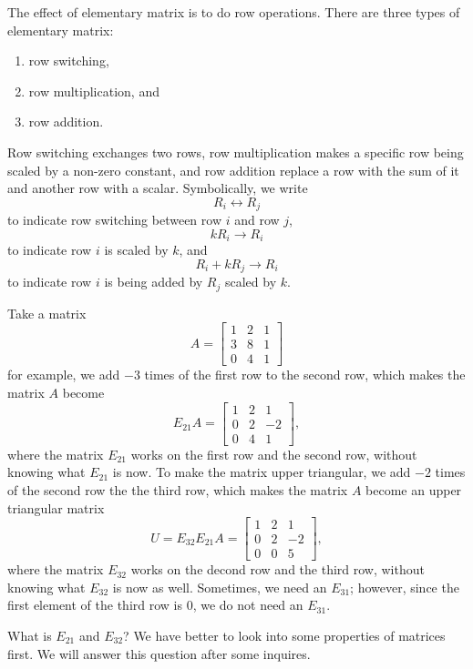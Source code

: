 \documentclass[11pt]{article}
\theoremstyle{break}
\theoremstyle{no_label}
\numberwithin{equation}{section}
\begin{document}
\begin{definition}
    The effect of elementary matrix is to do row operations. There are three types of elementary matrix: \begin{enumerate}
        \item row switching,
        \item row multiplication, and
        \item row addition.
    \end{enumerate}
    Row switching exchanges two rows, row multiplication makes a specific row being scaled by a non-zero constant, and row addition replace a row with the sum of it and another row with a scalar. Symbolically, we write $$R_i\leftrightarrow R_j$$ to indicate row switching between row $i$ and row $j$, $$kR_i\to R_i$$ to indicate row $i$ is scaled by $k$, and $$R_i+kR_j\to R_i$$ to indicate row $i$ is being added by $R_j$ scaled by $k$.
\end{definition}

Take a matrix $$A=\begin{bmatrix}
    1 & 2 & 1 \\
    3 & 8 & 1 \\
    0 & 4 & 1
\end{bmatrix}$$ for example, we add $-3$ times of the first row to the second row, which makes the matrix $A$ become $$E_{21}A=\begin{bmatrix}
    1 & 2 & 1 \\
    0 & 2 & -2 \\
    0 & 4 & 1
\end{bmatrix},$$ where the matrix $E_{21}$ works on the first row and the second row, without knowing what $E_{21}$ is now. To make the matrix upper triangular, we add $-2$ times of the second row the the third row, which makes the matrix $A$ become an upper triangular matrix $$U=E_{32}E_{21}A=\begin{bmatrix}
    1 & 2 & 1 \\
    0 & 2 & -2 \\
    0 & 0 & 5
\end{bmatrix},$$ where the matrix $E_{32}$ works on the decond row and the third row, without knowing what $E_{32}$ is now as well. Sometimes, we need an $E_{31}$; however, since the first element of the third row is $0$, we do not need an $E_{31}$.

What is $E_{21}$ and $E_{32}$? We have better to look into some properties of matrices first. We will answer this question after some inquires.
\end{document}
